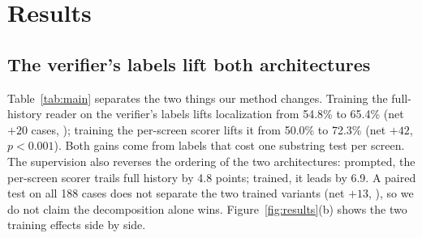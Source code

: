 \section{Results}

\subsection{The verifier's labels lift both architectures}
\label{sec:main}
\begin{table}[t]
\centering\footnotesize\setlength{\tabcolsep}{4pt}
\caption{Localization and end-to-end accuracy (\%) on 188 verified cases, five folds with every trajectory in one fold. Training on the verifier's labels lifts both architectures on both metrics; the paired test separates neither trained variant from the other. $t$ is the step index at which the need arises; \emph{net} counts the cases the scorer gets right and the row's condition gets wrong, minus the reverse, with the two-sided McNemar $p$. Prompted full history and the screen index read in their own single call; both per-screen scorer rows and the trained full-history reader use read with history.}
\label{tab:main}
\end{table}

Table~\ref{tab:main} separates the two things our method changes. Training the full-history reader on the verifier's labels lifts localization from 54.8\% to 65.4\% (net $+20$ cases, ); training the per-screen scorer lifts it from 50.0\% to 72.3\% (net $+42$, $p<0.001$). Both gains come from labels that cost one substring test per screen. The supervision also reverses the ordering of the two architectures: prompted, the per-screen scorer trails full history by 4.8 points; trained, it leads by 6.9. A paired test on all 188 cases does not separate the two trained variants (net $+13$, ), so we do not claim the decomposition alone wins. Figure~\ref{fig:results}(b) shows the two training effects side by side.


